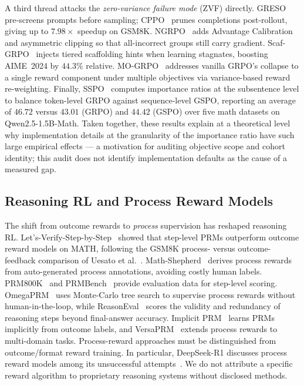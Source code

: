 A third thread attacks the \emph{zero-variance failure mode} (ZVF) directly.
GRESO~\cite{zhang2026greso} pre-screens prompts
before sampling; CPPO~\cite{lin2025cppo} prunes completions post-rollout,
giving up to $7.98\times$ speedup on GSM8K. NGRPO~\cite{nan2025ngrpo} adds
Advantage Calibration and asymmetric clipping so that all-incorrect groups
still carry gradient. Scaf-GRPO~\cite{zhang2025scaffgrpo} injects tiered
scaffolding hints when learning stagnates, boosting AIME~2024 by $44.3\%$
relative. MO-GRPO~\cite{ichihara2025mogrpo} addresses vanilla GRPO's
collapse to a single reward component under multiple objectives via
variance-based reward re-weighting. Finally,
SSPO~\cite{yang2025sspo} computes importance ratios at the subsentence level
to balance token-level GRPO against sequence-level GSPO, reporting an average
of $46.72$ versus $43.01$ (GRPO) and $44.42$ (GSPO) over five math datasets
on Qwen2.5-1.5B-Math. Taken together, these results explain at
a theoretical level why implementation details at the granularity of the
importance ratio have such large empirical effects --- a motivation for auditing objective scope and cohort identity; this audit
does not identify implementation defaults as the cause of a measured gap.

\subsection{Reasoning RL and Process Reward Models}
\label{sec:related:reasoning}

The shift from outcome rewards to \emph{process} supervision has reshaped
reasoning RL. Let's-Verify-Step-by-Step~\cite{lightman2023prm} showed
that step-level PRMs outperform outcome reward models on MATH, following the
GSM8K process- versus outcome-feedback comparison of
Uesato et al.~\cite{uesato2022prm800k}. Math-Shepherd~\cite{wang2024mathshepherd} derives process rewards
from auto-generated process annotations, avoiding costly human labels.
PRM800K~\cite{lightman2023prm} and PRMBench~\cite{song2024prmbench} provide
evaluation data for step-level scoring. OmegaPRM~\cite{luo2024omegaprm} uses
Monte-Carlo tree search to supervise process rewards without human-in-the-loop,
while ReasonEval~\cite{xia2024reasoneval} scores the validity and redundancy
of reasoning steps beyond final-answer accuracy. Implicit PRM~\cite{yuan2024implicitprm} learns PRMs implicitly from
outcome labels, and VersaPRM~\cite{yuan2025versaprm} extends process rewards
to multi-domain tasks. Process-reward approaches must be distinguished from outcome/format reward
training. In particular, DeepSeek-R1 discusses process reward models among its
unsuccessful attempts~\cite{guo2025deepseekr1}. We do not attribute a specific
reward algorithm to proprietary reasoning systems without disclosed methods.

